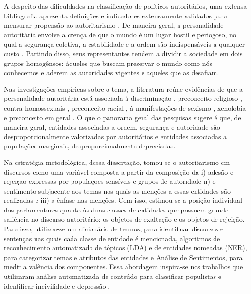 \documentclass[
12pt,				%
openright,			%
twoside,			%
a4paper,			%
english,			%
french,				%
spanish,			%
brazil				%
]{abntex2}
\begin{document}
A despeito das dificuldades na classificação de políticos autoritários, uma extensa bibliografia apresenta definições e indicadores extensamente validados para mensurar propensão ao autoritarismo \cite{titus1957california, meloen1993f}. De maneira geral, a personalidade autoritária envolve a crença de que o mundo é um lugar hostil e periogoso, no qual a segurança coletiva, a estabilidade e a ordem são indispensáveis a qualquer custo \cite{altemeyer1996authoritarian}. Partindo disso, seus representantes tendem a dividir a sociedade em dois grupos homogêneos: àqueles que buscam preservar o mundo como nós conhecemos e aderem as autoridades vigentes e aqueles que as desafiam.

Nas investigações empíricas sobre o tema, a literatura reúne evidências de que a personalidade autoritária está associada à discriminação \cite{titus1957california, meloen1993f}, preconceito religioso \cite{laythe2001predicting}, contra homossexuais \cite{hunsberger1996religious, jonathan2008influence}, preconceito racial \cite{rowatt2004christian}, à manifestações de sexismo \cite{sibley2007antecedents}, xenofobia \cite{thomsen2008we} e preconceito em geral \cite{asbrock2010right}. O que o panorama geral das pesquisas sugere é que, de maneira geral, entidades associadas a ordem, segurança e autoridade são desproporcionalmente valorizadas por autoritários e entidades associadas a populações marginais, desproporcionalmente depreciadas.

Na estratégia metodológica, dessa dissertação, tomou-se o autoritarismo em discursos como uma variável composta a partir da composição da i) adesão e rejeição expressas por populações sensíveis e grupos de autoridade ii) o sentimento subjacente aos temas nos quais as menções a essas entidades são realizadas e iii) a ênfase nas menções. Com isso, estimou-se a posição individual dos parlamentares quanto às duas classes de entidades que possuem grande saliência no discurso autoritário: os objetos de exaltação e os objetos de rejeição. Para isso, utilizou-se um dicionário de termos, para identificar discursos e sentenças nas quais cada classe de entidade é mencionada, algoritmos de reconhecimento automatizado de tópicos (LDA) e de entidades nomeadas (NER), para categorizar temas e atributos das entidades e Análise de Sentimentos, para medir a valência dos componentes. Essa abordagem inspira-se nos trabalhos que utilizaram análise automatizada de conteúdo para classificar populistas \cite{rooduijn2011measuring, oliver2016rise, aslanidis2018measuring} e identificar incivilidade \cite{vargo2017socioeconomic} e depressão \cite{neuman2012proactive, kang2016identifying}.
\end{document}
